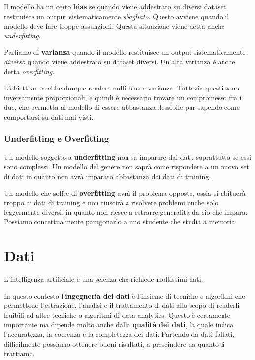         Il modello ha un certo \textbf{bias} se quando viene addestrato su diversi dataset, restituisce un output sistematicamente \textit{sbagliato}. Questo avviene quando il modello deve fare troppe assunzioni. Questa situazione viene detta anche \textit{underfitting}.
        
        Parliamo di \textbf{varianza} quando il modello restituisce un output sistematicamente \textit{diverso} quando viene addestrato su dataset diversi. Un'alta varianza è anche detta \textit{overfitting}.
        
        L'obiettivo sarebbe dunque rendere nulli bias e varianza. Tuttavia questi sono inversamente proporzionali, e quindi è necessario trovare un compromesso fra i due, che permetta al modello di essere abbastanza flessibile pur sapendo come comportarsi su dati mai visti.
        
    \subsubsection{Underfitting e Overfitting}
        Un modello soggetto a \textbf{underfitting} non sa imparare dai dati, soprattutto se essi sono complessi. Un modello del genere non saprà come rispondere a un nuovo set di dati in quanto non avrà imparato abbastanza dai dati di training.
        
        Un modello che soffre di \textbf{overfitting} avrà il problema opposto, ossia si abituerà troppo ai dati di training e non riuscirà a risolvere problemi anche solo leggermente diversi, in quanto non riesce a estrarre generalità da ciò che impara. Possiamo concettualmente paragonarlo a uno studente che studia a memoria.
        
\section{Dati}
    L'intelligenza artificiale è una scienza che richiede moltissimi dati.
    
    In questo contesto l'\textbf{ingegneria dei dati} è l'insieme di tecniche e algoritmi che permettono l'estrazione, l'analisi e il trattamento di dati allo scopo di renderli fruibili ad altre tecniche o algoritmi di data analytics. Questo è certamente importante ma dipende molto anche dalla \textbf{qualità dei dati}, la quale indica l'accuratezza, la coerenza e la completezza dei dati. Partendo da dati fallati, difficilmente possiamo ottenere buoni risultati, a prescindere da quanto li trattiamo.
    
